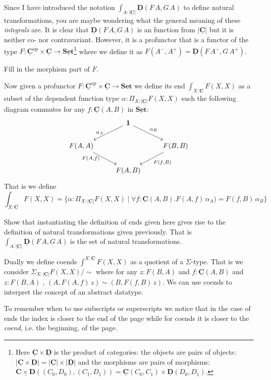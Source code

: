 \documentclass{article}
\newcommand{\Set}{\mathbf{Set}}
\newcommand{\cat}[1]{\underline{\mathbf{#1}}}
\newcommand{\obj}[1]{|#1|}
\newcommand{\homC}[3]{\cat{#1}(#2,#3)}
\newcommand{\op}{\mathrm{op}}
\begin{document}
Since I have introduced the notation $\int_{A : \obj{\cat{C}}} \cat{D}(F\,A,G\,A)$ to define natural transformations, you are maybe wondering what the general meaning of these \emph{integrals} are. It is clear that $\cat{D}(F\,A,G\,A)$ is an function from
$\obj{\cat{C}}$ but it is neither co- nor contravariant. However, it is a profunctor that is a functor of the type $F : \cat{C}^\op\times\cat{C} \to \cat{\Set}$\footnote{Here $\cat{C}\times\cat{D}$ is the product of categories: the objects are pairs of objects: $\obj{\cat{C}\times\cat{D}}=\obj{\cat{C}}\times\obj{\cat{D}}$ and the morphisms are pairs of morphisms: $\homC{C \times D}{(C_0,D_0)}{(C_1,D_1)}=\homC{C}{C_0}{C_1}\times\homC{D}{D_0}{D_1}$.} where we define it as $F(A^{-},A^{+})= \cat{D}(F\,A^{-},G\,A^{+})$.
\begin{Exercise}
  Fill in the morphism part of $F$.
\end{Exercise}
Now given a profunctor $F : \cat{C}^\op\times\cat{C} \to \Set$ we define its end $\int_{X: \cat{C}}F(X,X)$ as a subset of the dependent function type $\alpha:\Pi_{X : \obj{\cat{C}}}F(X,X)$ such the following diagram commutes for any $f : \homC{C}{A}{B}$ in $\cat{Set}$:
\[\begin{tikzcd}
  & \bf{1} \arrow[dl,"\alpha_A" left=5]\arrow[dr,"\alpha_B"]\\
  F(A,A) \arrow[dr, "F(A {,} f)" left= 5] & & F(B,B) \arrow[dl,"F(f {,} B)"]\\  
  & F(A,B) 
\end{tikzcd}
\]
That is we define
\[ \int_{X:\cat{C}} F(X,X) = \{ \alpha : \Pi_{X : \obj{\cat{C}}}F(X,X) \mid
  \forall {f : \homC{C}{A}{B}} . F(A,f)\,\alpha_A) = F(f,B)\,\alpha_B \}\]
\begin{Exercise}
  Show that instantiating the definition of ends given here gives rise to the definition of natural transformations given previously.
  That is $\int_{A : \obj{\cat{C}}} \cat{D}(F\,A,G\,A)$ is the set of natural transformations.
\end{Exercise}

Dually we define coends $\int^{X:\cat{C}} F(X,X)$ as a quotient of a $\Sigma$-type. That is we consider
$\Sigma_{X : \obj{\cat{C}}}F(X,X) / \sim$ where for any  $z : F(B,A)$ and $f: \homC{C}{A}{B}$ and $z : F(B,A)$ ,
$(A,F(A,f)\,z) \sim (B,F(f,B)\,z)$. We can use coends to interpret the concept of an abstract datatype.


To remember when to use subscripts or superscripts we notice that in the case of ends the index is closer to the end of the page while for coends it is closer to the \emph{coend}, i.e. the beginning, of the page.
\end{document}
